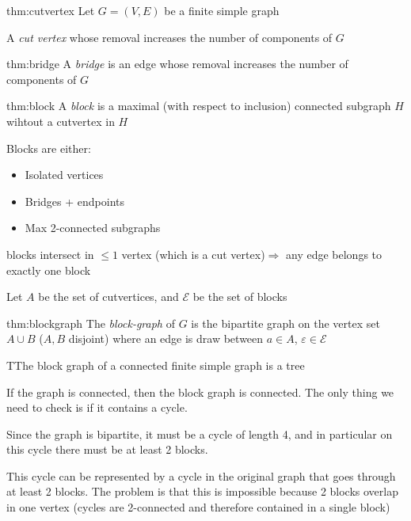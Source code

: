 \par\bigskip
\begin{theo}{thm:cutvertex}
  Let $G = (V,E)$ be a finite simple graph\par
  \noindent A \textit{cut vertex} whose removal increases the number of components of $G$
\end{theo}
\par\bigskip
\begin{theo}[Bridge]{thm:bridge}
  A \textit{bridge} is an edge whose removal increases the number of components of $G$
\end{theo}
\par\bigskip
\begin{theo}[Block]{thm:block}
  A \textit{block} is a maximal (with respect to inclusion) connected subgraph $H$ wihtout a cutvertex in $H$\par
  \noindent Blocks are either:
  \begin{itemize}
    \item Isolated vertices
    \item Bridges + endpoints
    \item Max 2-connected subgraphs
  \end{itemize}
\end{theo}
\par\bigskip
{} blocks intersect in $\leq1$ vertex (which is a cut vertex)$\Rightarrow$ any edge belongs to exactly one block
\par\bigskip
\noindent Let $A$ be the set of cutvertices, and $\mathcal{E}$ be the set of blocks
\par\bigskip
\begin{theo}{thm:blockgraph}
  The \textit{block-graph} of $G$ is the bipartite graph on the vertex set $A\cup B$ ($A,B$ disjoint) where an edge is draw between $a\in A$, $\varepsilon\in\mathcal{E}$
\end{theo}
\par\bigskip
\begin{lem}
  TThe block graph of a connected finite simple graph is a tree 
\end{lem}
\par\bigskip
\begin{prf}
  If the graph is connected, then the block graph is connected. The only thing we need to check is if it contains a cycle.\par
  \noindent Since the graph is bipartite, it must be a cycle of length 4, and in particular on  this cycle there must be at least 2 blocks.\par
  \noindent This cycle can be represented by a cycle in the original graph that goes through at least 2 blocks. The problem is that this is impossible because 2 blocks overlap in one vertex (cycles are 2-connected and therefore contained in a single block)
\end{prf}
